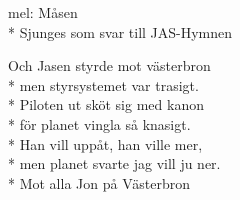 \begin{SongText}[JASen]
    \begin{SongInfo}
        mel: Måsen\\*%
        Sjunges som svar till JAS-Hymnen
    \end{SongInfo}
    \begin{SongVerse}
        Och Jasen styrde mot västerbron\\*%
        men styrsystemet var trasigt.\\*%
        Piloten ut sköt sig med kanon\\*%
        för planet vingla så knasigt.\\*%
        Han vill uppåt, han ville mer,\\*%
        men planet svarte jag vill ju ner.\\*%
        Mot alla Jon på Västerbron
    \end{SongVerse}
\end{SongText}
